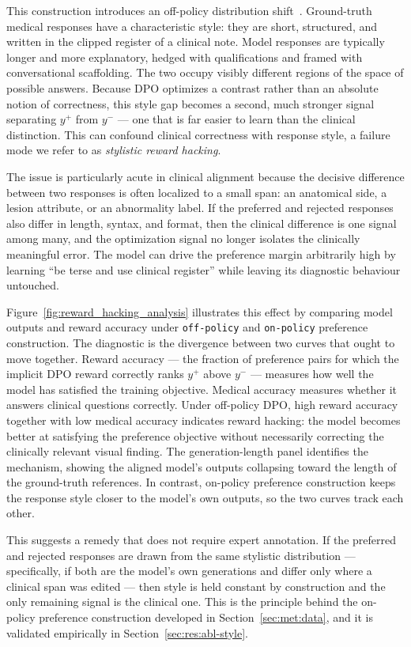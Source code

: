 This construction introduces an off-policy distribution shift~\cite{yang2025mitigating}. Ground-truth medical responses have a characteristic style: they are short, structured, and written in the clipped register of a clinical note. Model responses are typically longer and more explanatory, hedged with qualifications and framed with conversational scaffolding. The two occupy visibly different regions of the space of possible answers. Because DPO optimizes a contrast rather than an absolute notion of correctness, this style gap becomes a second, much stronger signal separating $y^+$ from $y^-$ --- one that is far easier to learn than the clinical distinction. This can confound clinical correctness with response style, a failure mode we refer to as \emph{stylistic reward hacking}.

The issue is particularly acute in clinical alignment because the decisive difference between two responses is often localized to a small span: an anatomical side, a lesion attribute, or an abnormality label. If the preferred and rejected responses also differ in length, syntax, and format, then the clinical difference is one signal among many, and the optimization signal no longer isolates the clinically meaningful error. The model can drive the preference margin arbitrarily high by learning ``be terse and use clinical register'' while leaving its diagnostic behaviour untouched.

Figure~\ref{fig:reward_hacking_analysis} illustrates this effect by comparing model outputs and reward accuracy under \texttt{off-policy} and \texttt{on-policy} preference construction. The diagnostic is the divergence between two curves that ought to move together. Reward accuracy --- the fraction of preference pairs for which the implicit DPO reward correctly ranks $y^+$ above $y^-$ --- measures how well the model has satisfied the training objective. Medical accuracy measures whether it answers clinical questions correctly. Under off-policy DPO, high reward accuracy together with low medical accuracy indicates reward hacking: the model becomes better at satisfying the preference objective without necessarily correcting the clinically relevant visual finding. The generation-length panel identifies the mechanism, showing the aligned model's outputs collapsing toward the length of the ground-truth references. In contrast, on-policy preference construction keeps the response style closer to the model's own outputs, so the two curves track each other.

This suggests a remedy that does not require expert annotation. If the preferred and rejected responses are drawn from the same stylistic distribution --- specifically, if both are the model's own generations and differ only where a clinical span was edited --- then style is held constant by construction and the only remaining signal is the clinical one. This is the principle behind the on-policy preference construction developed in Section~\ref{sec:met:data}, and it is validated empirically in Section~\ref{sec:res:abl-style}.

